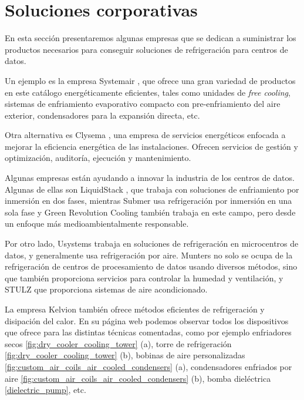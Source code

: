 \section{Soluciones corporativas} \label{empresas}

En esta sección presentaremos algunas empresas que se dedican a suministrar los productos necesarios para conseguir soluciones de refrigeración para centros de datos.

Un ejemplo es la empresa Systemair \cite{systemair}, que ofrece una gran variedad de productos en este catálogo  energéticamente eficientes, tales como unidades de \textit{free cooling}, sistemas de enfriamiento evaporativo compacto con pre-enfriamiento del aire exterior, condensadores para la expansión directa, etc.

Otra alternativa es Clysema \cite{clysema}, una empresa de servicios energéticos enfocada a mejorar la eficiencia energética de las instalaciones. Ofrecen servicios de gestión y optimización, auditoría, ejecución y mantenimiento.

Algunas empresas están ayudando a innovar la industria de los centros de datos. Algunas de ellas son LiquidStack \cite{liquidstack}, que trabaja con soluciones de enfriamiento por inmersión en dos fases, mientras Submer \cite{submer} usa refrigeración por inmersión en una sola fase y Green Revolution Cooling \cite{GRC} también trabaja en este campo, pero desde un enfoque más medioambientalmente responsable. 

Por otro lado, Usystems \cite{usystems} trabaja en soluciones de refrigeración en microcentros de datos, y generalmente usa refrigeración por aire. Munters \cite{munters} no solo se ocupa de la refrigeración de centros de procesamiento de datos usando diversos métodos, sino que también proporciona servicios para controlar la humedad y ventilación, y STULZ \cite{stulz} que proporciona sistemas de aire acondicionado.

La empresa Kelvion \cite{Kelvion} también ofrece métodos eficientes de refrigeración y disipación del calor. En su página web podemos observar todos los dispositivos que ofrece para las distintas técnicas comentadas, como por ejemplo enfriadores secos \eqref{fig:dry_cooler_cooling_tower} (a), torre de refrigeración \eqref{fig:dry_cooler_cooling_tower} (b), bobinas de aire personalizadas \eqref{fig:custom_air_coils_air_cooled_condensers} (a), condensadores enfriados por aire \eqref{fig:custom_air_coils_air_cooled_condensers} (b), bomba dieléctrica \eqref{dielectric_pump}, etc.

